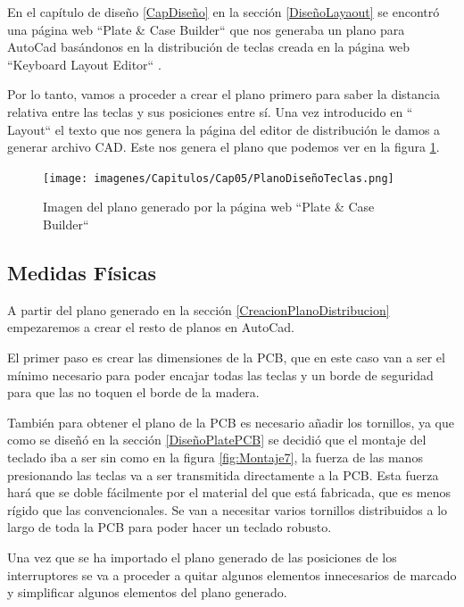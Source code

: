 En el capítulo de diseño \ref{CapDiseño} en la sección \ref{DiseñoLayaout} se encontró una página web ``Plate \& Case Builder`` \cite{builder-swillkb} que nos generaba un plano para AutoCad basándonos en la distribución de teclas creada en la página web ``Keyboard Layout Editor`` \cite{Layout-Editor}.

Por lo tanto, vamos a proceder a crear el plano primero para saber la distancia relativa entre las teclas y sus posiciones entre sí. Una vez introducido en `` Layout`` el texto que nos genera la página del editor de distribución le damos a generar archivo CAD. Este nos genera el plano que podemos ver en la figura \ref{fig:PlanoDistribucionLayout}.

\begin{figure}[H]
    \centering
    \texttt{[image: imagenes/Capitulos/Cap05/PlanoDiseñoTeclas.png]}
    \caption{Imagen del plano generado por la página web ``Plate \& Case Builder`` \cite{builder-swillkb}}
    \label{fig:PlanoDistribucionLayout}
\end{figure}

\subsection{Medidas Físicas} \label{MedidasFisicas}

A partir del plano generado en la sección \ref{CreacionPlanoDistribucion} empezaremos a crear el resto de planos en AutoCad.

El primer paso es crear las dimensiones de la \gls{PCB}, que en este caso van a ser el mínimo necesario para poder encajar todas las teclas y un borde de seguridad para que las  no toquen el borde de la madera.

También para obtener el plano de la \gls{PCB} es necesario añadir los tornillos, ya que como se diseñó en la sección \ref{DiseñoPlatePCB} se decidió que el montaje del teclado iba a ser sin  como en la figura \ref{fig:Montaje7}, la fuerza de las manos presionando las teclas va a ser transmitida directamente a la \gls{PCB}. Esta fuerza hará que se doble fácilmente por el material del que está fabricada, que es menos rígido que las  convencionales. Se van a necesitar varios tornillos distribuidos a lo largo de toda la \gls{PCB} para poder hacer un teclado robusto.

Una vez que se ha importado el plano generado de las posiciones de los interruptores se va a proceder a quitar algunos elementos innecesarios de marcado y simplificar algunos elementos del plano generado.

